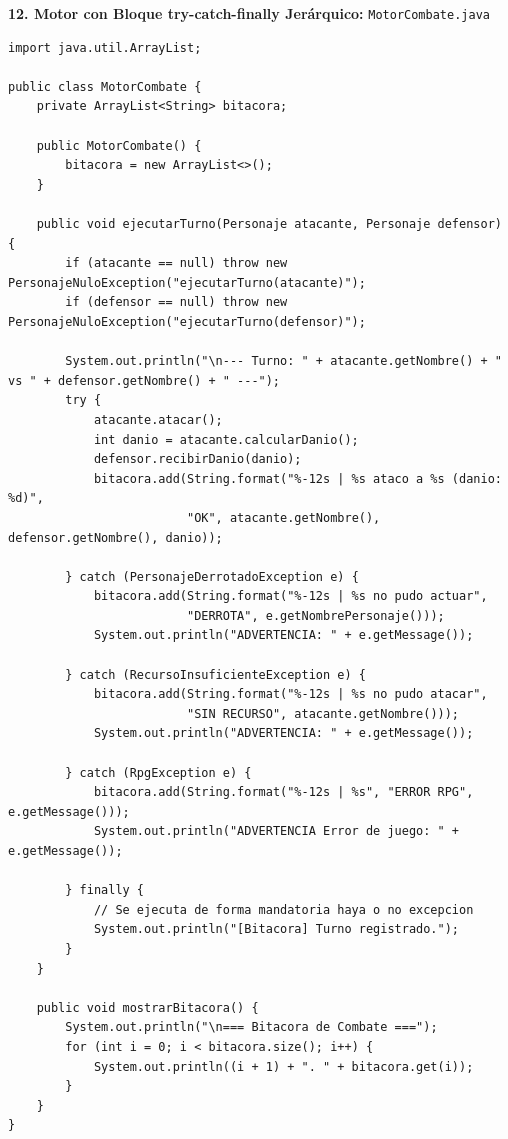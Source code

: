 \documentclass[11pt,letterpaper]{article}
\begin{document}
\textbf{12. Motor con Bloque try-catch-finally Jerárquico:} \texttt{MotorCombate.java}
\begin{lstlisting}[style=JavaStyle]
import java.util.ArrayList;

public class MotorCombate {
    private ArrayList<String> bitacora;

    public MotorCombate() {
        bitacora = new ArrayList<>();
    }

    public void ejecutarTurno(Personaje atacante, Personaje defensor) {
        if (atacante == null) throw new PersonajeNuloException("ejecutarTurno(atacante)");
        if (defensor == null) throw new PersonajeNuloException("ejecutarTurno(defensor)");

        System.out.println("\n--- Turno: " + atacante.getNombre() + " vs " + defensor.getNombre() + " ---");
        try {
            atacante.atacar();
            int danio = atacante.calcularDanio();
            defensor.recibirDanio(danio);
            bitacora.add(String.format("%-12s | %s ataco a %s (danio: %d)",
                         "OK", atacante.getNombre(), defensor.getNombre(), danio));

        } catch (PersonajeDerrotadoException e) {
            bitacora.add(String.format("%-12s | %s no pudo actuar",
                         "DERROTA", e.getNombrePersonaje()));
            System.out.println("ADVERTENCIA: " + e.getMessage());

        } catch (RecursoInsuficienteException e) {
            bitacora.add(String.format("%-12s | %s no pudo atacar",
                         "SIN RECURSO", atacante.getNombre()));
            System.out.println("ADVERTENCIA: " + e.getMessage());

        } catch (RpgException e) {
            bitacora.add(String.format("%-12s | %s", "ERROR RPG", e.getMessage()));
            System.out.println("ADVERTENCIA Error de juego: " + e.getMessage());

        } finally {
            // Se ejecuta de forma mandatoria haya o no excepcion
            System.out.println("[Bitacora] Turno registrado.");
        }
    }

    public void mostrarBitacora() {
        System.out.println("\n=== Bitacora de Combate ===");
        for (int i = 0; i < bitacora.size(); i++) {
            System.out.println((i + 1) + ". " + bitacora.get(i));
        }
    }
}
\end{lstlisting}
\end{document}
